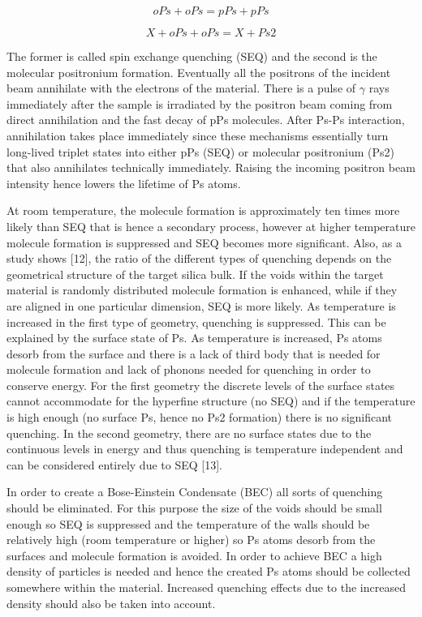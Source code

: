 \begin{equation}
\label{e7}
oPs + oPs = pPs +pPs
\end{equation}

\begin{equation}
\label{e8}
X+oPs+oPs=X+Ps2
\end{equation}

The former is called spin exchange quenching (SEQ) and the second is the molecular positronium formation.
Eventually all the positrons of the incident beam annihilate with the electrons of the material. There is a pulse of $\gamma$ rays immediately after the sample is irradiated by the positron beam coming from direct annihilation and the fast decay of pPs molecules.	After Ps-Ps interaction, annihilation takes place immediately since these mechanisms essentially turn long-lived triplet states into either pPs (SEQ) or molecular positronium (Ps2) that also annihilates technically immediately. Raising the incoming positron beam intensity hence lowers the lifetime of Ps atoms.

At room temperature, the molecule formation is approximately ten times more likely than SEQ that is hence a secondary process, however at higher temperature molecule formation is suppressed and SEQ becomes more significant. Also, as a study shows [12], the ratio of the different types of quenching depends on the geometrical structure of the target silica bulk. If the voids within the target material is randomly distributed molecule formation is enhanced, while if they are aligned in one particular dimension, SEQ is more likely. As temperature is increased in the first type of geometry, quenching is suppressed. This can be explained by the surface state of Ps. As temperature is increased, Ps atoms desorb from the surface and there is a lack of third body that is needed for molecule formation and lack of phonons needed for quenching in order to conserve energy. For the first geometry the discrete levels of the surface states cannot accommodate for the hyperfine structure (no SEQ) and if the temperature is high enough (no surface Ps, hence no Ps2 formation) there is no significant quenching. In the second geometry, there are no surface states due to the continuous levels in energy and thus quenching is temperature independent and can be considered entirely due to SEQ [13].

In order to create a Bose-Einstein Condensate (BEC) all sorts of quenching should be eliminated. For this purpose the size of the voids should be small enough so SEQ is suppressed and the temperature of the walls should be relatively high (room temperature or higher) so Ps atoms desorb from the surfaces and molecule formation is avoided. In order to achieve BEC a high density of particles is needed and hence the created Ps atoms should be collected somewhere within the material. Increased quenching effects due to the increased density should also be taken into account.

